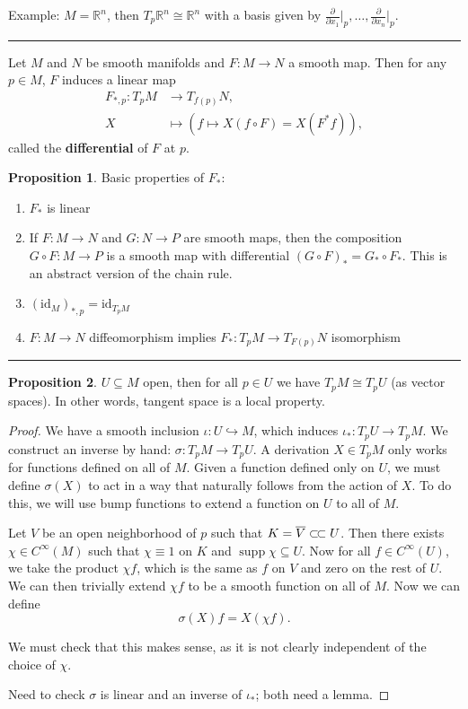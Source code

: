 \documentclass[12pt]{article}
\newcommand{\keyword}[1]{\textbf{#1}}
\newcommand{\sepline}{\rule{\textwidth}{0.4pt}}
\theoremstyle{definition}
\newtheorem{proposition}{Proposition}
\newcommand{\R}{\mathbb{R}}
\newcommand{\<}{\left\langle}
\renewcommand{\>}{\right\rangle}
\newcommand{\iso}{\cong}
\newcommand{\seq}{\subseteq}
\newcommand{\inc}{\hookrightarrow}
\newcommand{\To}{\longrightarrow}
\newcommand{\Mapsto}{\longmapsto}
\newcommand{\csub}{\subset\joinrel\subset}
\newcommand{\id}{\mathrm{id}}
\DeclareMathOperator{\supp}{supp}
\newcommand{\pdv}[2]{\frac{\partial #1}{\partial #2}}
\newcommand{\clo}{\overline}
\begin{document}
Example: $M = \R^n$, then $T_p\R^n \iso \R^n$ with a basis given by $\pdv{}{x_1}\big|_p, \dots, \pdv{}{x_n}\big|_p$.

\sepline

Let $M$ and $N$ be smooth manifolds and $F : M \to N$ a smooth map.
Then for any $p \in M$, $F$ induces a linear map
\begin{align*}
    F_{*,p} : T_pM &\To T_{f(p)}N, \\
        X &\Mapsto (f \mapsto X(f \circ F) = X(F^*f)),
\end{align*}
called the \keyword{differential} of $F$ at $p$.

\begin{proposition}
    Basic properties of $F_*$:
    \begin{enumerate}[(1)]
        \item $F_*$ is linear
        \item If $F : M \to N$ and $G : N \to P$ are smooth maps, then the composition $G \circ F : M \to P$ is a smooth map with differential $(G \circ F)_* = G_* \circ F_*$.
        This is an abstract version of the chain rule.
        \item $(\id_M)_{*,p} = \id_{T_pM}$
        \item $F : M \to N$ diffeomorphism implies $F_* : T_pM \to T_{F(p)}N$ isomorphism
    \end{enumerate}
\end{proposition}

\sepline

\begin{proposition}
    $U \seq M$ open, then for all $p \in U$ we have $T_pM \iso T_pU$ (as vector spaces).
    In other words, tangent space is a local property.
\end{proposition}

\begin{proof}
    We have a smooth inclusion $\iota : U \inc M$, which induces $\iota_* : T_pU \to T_pM$.
    We construct an inverse by hand: $\sigma : T_pM \to T_pU$.
    A derivation $X \in T_pM$ only works for functions defined on all of $M$.
    Given a function defined only on $U$, we must define $\sigma(X)$ to act in a way that naturally follows from the action of $X$.
    To do this, we will use bump functions to extend a function on $U$ to all of $M$.

    Let $V$ be an open neighborhood of $p$ such that $K = \clo{V} \csub U$.
    Then there exists $\chi \in C^\infty(M)$ such that $\chi \equiv 1$ on $K$ and $\supp\chi \seq U$.
    Now for all $f \in C^\infty(U)$, we take the product $\chi f$, which is the same as $f$ on $V$ and zero on the rest of $U$.
    We can then trivially extend $\chi f$ to be a smooth function on all of $M$.
    Now we can define
    \[
        \sigma(X)f = X(\chi f).
    \]

    We must check that this makes sense, as it is not clearly independent of the choice of $\chi$.

    Need to check $\sigma$ is linear and an inverse of $\iota_*$; both need a lemma.
\end{proof}
\end{document}
